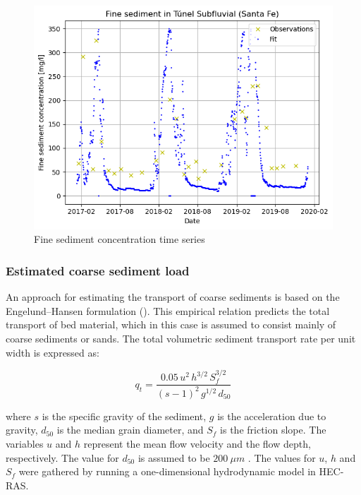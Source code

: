 \begin{figure}[H]
    \centering
    \includegraphics[width=0.5\linewidth]{figures/ch6/fine sediment concentrations.png}
    \caption{Fine sediment concentration time series}
    \label{fig:timeseries fine sediments}
\end{figure}



\subsubsection{Estimated coarse sediment load}
An approach for estimating the transport of coarse sediments is based on the Engelund–Hansen formulation (\cite{engelundMonographSedimentTransport1967}). This empirical relation predicts the total transport of bed material, which in this case is assumed to consist mainly of coarse sediments or sands. The total volumetric sediment transport rate per unit width is expressed as:

\begin{equation}
    q_{t} = \frac{0.05\,u^{2}\,h^{3/2}\,S_{f}^{3/2}}{(s - 1)^{2}\,g^{1/2}\,d_{50}}
    \label{eq:engelund_hansen}
\end{equation}

where \( s \) is the specific gravity of the sediment, \( g \) is the acceleration due to gravity, \( d_{50} \) is the median grain diameter, and \( S_{f} \) is the friction slope. The variables \( u \) and \( h \) represent the mean flow velocity and the flow depth, respectively. The value for $d_{50}$ is assumed to be $200 ~\mu m$ \autocite{reMetodologiaParaGeneracion2009}. The values for $u$, $h$ and $S_f$ were gathered by running a one-dimensional hydrodynamic model in HEC-RAS. 






